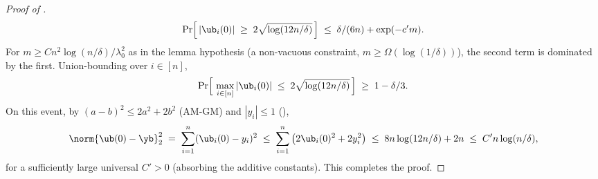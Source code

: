 \begin{proof}[Proof of ]
\begin{align*}
\Pr\!\Big[ \, |\ub_i(0)| \;\ge\; 2 \sqrt{\log(12n/\delta)} \, \Big] \;\le\; \delta/(6n) + \exp(- c' m).
\end{align*}
For $m \ge C n^2 \log(n/\delta) / \lambda_0^2$ as in the lemma hypothesis (a non-vacuous constraint, $m \ge \Omega(\log(1/\delta))$), the second term is dominated by the first. Union-bounding over $i \in [n]$,
\begin{align*}
\Pr\!\Big[ \, \max_{i \in [n]} |\ub_i(0)| \;\le\; 2 \sqrt{\log(12 n / \delta)} \, \Big] \;\ge\; 1 - \delta/3.
\end{align*}
On this event, by $(a - b)^2 \le 2 a^2 + 2 b^2$ (AM-GM) and $|y_i| \le 1$ (),
\begin{align*}
\norm{\ub(0) - \yb}_2^2
\;=\; \sum_{i=1}^n (\ub_i(0) - y_i)^2
\;\le\; \sum_{i=1}^n \big( 2 \ub_i(0)^2 + 2 y_i^2 \big)
\;\le\; 8 n \log(12 n / \delta) + 2 n
\;\le\; C' n \log(n / \delta),
\end{align*}
for a sufficiently large universal $C' > 0$ (absorbing the additive constants). This completes the proof.
\end{proof}

